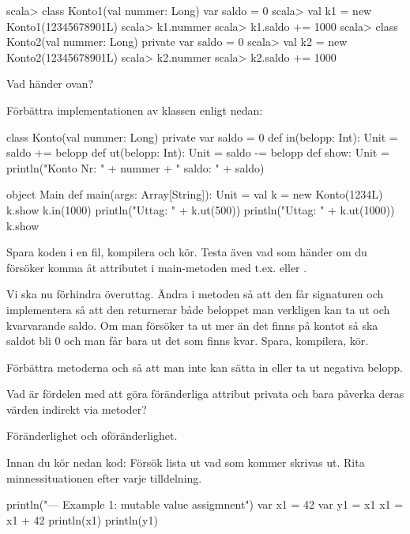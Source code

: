 \begin{REPL}
scala> class Konto1(val nummer: Long){ var saldo = 0 }
scala> val k1 = new Konto1(12345678901L)
scala> k1.nummer
scala> k1.saldo += 1000
scala> class Konto2(val nummer: Long){ private var saldo = 0 }
scala> val k2 = new Konto2(12345678901L)
scala> k2.nummer
scala> k2.saldo += 1000
\end{REPL}

\Subtask Vad händer ovan?

\Subtask Förbättra implementationen av klassen  enligt nedan:

\begin{Code}
class Konto(val nummer: Long){ 
  private var saldo = 0
  def in(belopp: Int): Unit = {saldo += belopp}
  def ut(belopp: Int): Unit = {saldo -= belopp}
  def show: Unit = 
    println("Konto Nr: " + nummer + " saldo: " + saldo) 
}

object Main {
  def main(args: Array[String]): Unit = {
    val k = new Konto(1234L)
    k.show
    k.in(1000)
    println("Uttag: " + k.ut(500))
    println("Uttag: " + k.ut(1000))
    k.show
  }
}
\end{Code}

\Subtask Spara koden i en fil, kompilera och kör. Testa även vad som händer om du försöker komma åt attributet  i main-metoden med t.ex.  eller . 

\Subtask Vi ska nu förhindra överuttag. Ändra i metoden  så att den får signaturen  och implementera  så att den returnerar både beloppet man verkligen kan ta ut och kvarvarande saldo. Om man försöker ta ut mer än det finns på kontot så ska saldot bli 0 och man får bara ut det som finns kvar. Spara, kompilera, kör. 

\Subtask Förbättra metoderna  och  så att man inte kan sätta in eller ta ut negativa belopp.

\Subtask Vad är fördelen med att göra föränderliga attribut privata och bara påverka deras värden indirekt via metoder?



\Task Föränderlighet och oföränderlighet.

\Subtask Innan du kör nedan kod: Försök lista ut vad som kommer skrivas ut. Rita minnessituationen efter varje tilldelning.

\begin{Code}
println("\n--- Example 1: mutable value assigmnent")
var x1 = 42
var y1 = x1
x1 = x1 + 42
println(x1)
println(y1)
\end{Code}

